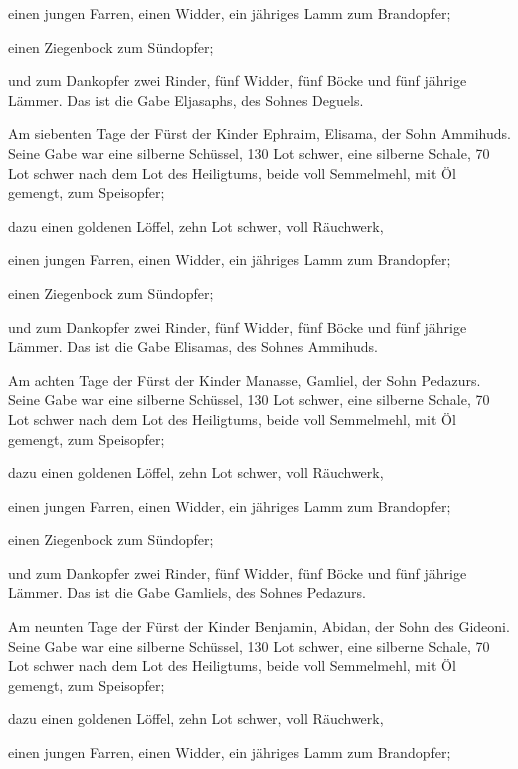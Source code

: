  einen jungen Farren, einen Widder, ein jähriges Lamm zum
Brandopfer;

 einen Ziegenbock zum Sündopfer;

 und zum Dankopfer zwei Rinder, fünf Widder, fünf Böcke
und fünf jährige Lämmer. Das ist die Gabe Eljasaphs, des Sohnes Deguels.

 Am siebenten Tage der Fürst der Kinder Ephraim, Elisama,
der Sohn Ammihuds.  Seine Gabe war eine silberne
Schüssel, 130 Lot schwer, eine silberne Schale, 70 Lot schwer nach dem
Lot des Heiligtums, beide voll Semmelmehl, mit Öl gemengt, zum
Speisopfer;

 dazu einen goldenen Löffel, zehn Lot schwer, voll
Räuchwerk,

 einen jungen Farren, einen Widder, ein jähriges Lamm zum
Brandopfer;

 einen Ziegenbock zum Sündopfer;

 und zum Dankopfer zwei Rinder, fünf Widder, fünf Böcke
und fünf jährige Lämmer. Das ist die Gabe Elisamas, des Sohnes Ammihuds.

 Am achten Tage der Fürst der Kinder Manasse, Gamliel,
der Sohn Pedazurs.  Seine Gabe war eine silberne
Schüssel, 130 Lot schwer, eine silberne Schale, 70 Lot schwer nach dem
Lot des Heiligtums, beide voll Semmelmehl, mit Öl gemengt, zum
Speisopfer;

 dazu einen goldenen Löffel, zehn Lot schwer, voll
Räuchwerk,

 einen jungen Farren, einen Widder, ein jähriges Lamm zum
Brandopfer;

 einen Ziegenbock zum Sündopfer;

 und zum Dankopfer zwei Rinder, fünf Widder, fünf Böcke
und fünf jährige Lämmer. Das ist die Gabe Gamliels, des Sohnes Pedazurs.

 Am neunten Tage der Fürst der Kinder Benjamin, Abidan,
der Sohn des Gideoni.  Seine Gabe war eine silberne
Schüssel, 130 Lot schwer, eine silberne Schale, 70 Lot schwer nach dem
Lot des Heiligtums, beide voll Semmelmehl, mit Öl gemengt, zum
Speisopfer;

 dazu einen goldenen Löffel, zehn Lot schwer, voll
Räuchwerk,

 einen jungen Farren, einen Widder, ein jähriges Lamm zum
Brandopfer;

